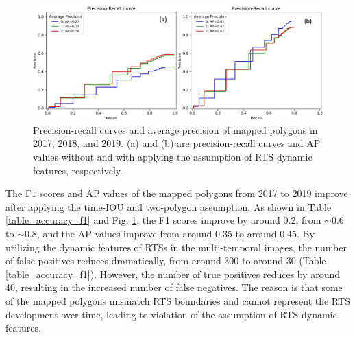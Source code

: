 \documentclass[authoryear,preprint,review,12pt]{elsarticle}
\begin{document}
\begin{figure}
	\centering
	\includegraphics[width=14cm]{figs/exp14_p_r_curves_allPoly_trim.jpg}
	\caption{Precision-recall curves and average precision of mapped polygons in 2017, 2018, and 2019. (a) and (b) are precision-recall curves and AP values without and with applying the assumption of RTS dynamic features, respectively.}
	\label{fig_p_r_curve}
\end{figure}




The F1 scores and AP values of the mapped polygons from 2017 to 2019 improve after applying the time-IOU and two-polygon assumption. 
As shown in Table \ref{table_accuracy_f1} and Fig. \ref{fig_p_r_curve}, the F1 scores improve by around 0.2, from $\sim$0.6 to $\sim$0.8, and the AP values improve from around 0.35 to around 0.45. 
By utilizing the dynamic features of RTSs in the multi-temporal images, the number of false positives reduces dramatically, from around 300 to around 30 (Table \ref{table_accuracy_f1}).
However, the number of true positives reduces by around 40, resulting in the increased number of false negatives. 
The reason is that some of the mapped polygons mismatch RTS boundaries and cannot represent the RTS development over time, leading to violation of the assumption of RTS dynamic features. 
 
\end{document}
